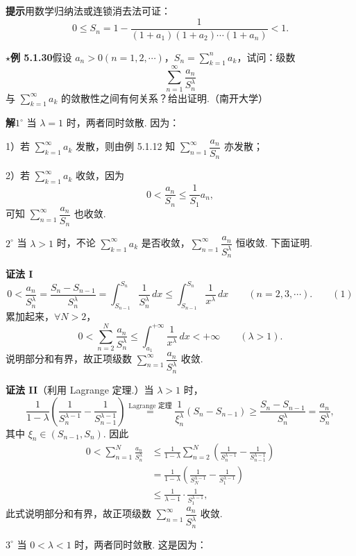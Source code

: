 \documentclass[UTF8, 12pt, fontset=fandol, oneside]{ctexart}
\begin{document}
\noindent\textbf{提示}\quad 用数学归纳法或连锁消去法可证：
\[
  0\le S_n=
  1-\frac1{(1+a_1)(1+a_2)\cdots(1+a_n)}<1.
\]

\noindent\textbf{$\star$例 5.1.30}\quad 假设 $a_n>0(n=1,2,\cdots)$，$S_n=\displaystyle\sum_{k=1}^n a_k$，试问：级数
\[
  \sum_{n=1}^\infty\frac{a_n}{S_n^\lambda}
\]
与 $\displaystyle\sum_{k=1}^\infty a_k$ 的敛散性之间有何关系？给出证明.（南开大学）

\noindent\textbf{解}\quad $1^\circ$ 当 $\lambda=1$ 时，两者同时敛散. 因为：

1）若 $\displaystyle\sum_{k=1}^\infty a_k$ 发散，则由例 5.1.12 知 $\displaystyle\sum_{n=1}^\infty\dfrac{a_n}{S_n}$ 亦发散；

2）若 $\displaystyle\sum_{k=1}^\infty a_k$ 收敛，因为
\[
  0<\frac{a_n}{S_n}\le\frac1{S_1}a_n,
\]
可知 $\displaystyle\sum_{n=1}^\infty\dfrac{a_n}{S_n}$ 也收敛.

$2^\circ$ 当 $\lambda>1$ 时，不论 $\displaystyle\sum_{k=1}^\infty a_k$ 是否收敛，$\displaystyle\sum_{n=1}^\infty\dfrac{a_n}{S_n^\lambda}$ 恒收敛. 下面证明.

\noindent\textbf{证法 I}\quad
\[
  0<\frac{a_n}{S_n^\lambda}
  =\frac{S_n-S_{n-1}}{S_n^\lambda}
  =\int_{S_{n-1}}^{S_n}\frac1{S_n^\lambda}\,dx
  \le\int_{S_{n-1}}^{S_n}\frac1{x^\lambda}\,dx
  \qquad(n=2,3,\cdots).
\qquad(1)
\]
累加起来，$\forall N>2$，
\[
  0<\sum_{n=2}^N\frac{a_n}{S_n^\lambda}
  \le\int_{a_1}^{+\infty}\frac1{x^\lambda}\,dx<+\infty
  \qquad(\lambda>1).
\]
说明部分和有界，故正项级数 $\displaystyle\sum_{n=1}^\infty\dfrac{a_n}{S_n^\lambda}$ 收敛.

\noindent\textbf{证法 II}\quad （利用 Lagrange 定理.）当 $\lambda>1$ 时，
\[
  \frac1{1-\lambda}\left(\frac1{S_n^{\lambda-1}}-\frac1{S_{n-1}^{\lambda-1}}\right)
  \stackrel{\text{Lagrange 定理}}{=}
  \frac1{\xi_n^\lambda}(S_n-S_{n-1})
  \ge\frac{S_n-S_{n-1}}{S_n^\lambda}
  =\frac{a_n}{S_n^\lambda},
\]
其中 $\xi_n\in(S_{n-1},S_n)$. 因此
\[
\begin{aligned}
0<\sum_{n=1}^N\frac{a_n}{S_n^\lambda}
&\le\frac1{1-\lambda}\sum_{n=2}^N\left(\frac1{S_n^{\lambda-1}}-\frac1{S_{n-1}^{\lambda-1}}\right)\\
&=\frac1{1-\lambda}\left(\frac1{S_N^{\lambda-1}}-\frac1{S_1^{\lambda-1}}\right)\\
&\le\frac1{\lambda-1}\cdot\frac1{S_1^{\lambda-1}},
\end{aligned}
\]
此式说明部分和有界，故正项级数 $\displaystyle\sum_{n=1}^\infty\dfrac{a_n}{S_n^\lambda}$ 收敛.

$3^\circ$ 当 $0<\lambda<1$ 时，两者同时敛散. 这是因为：
\end{document}
